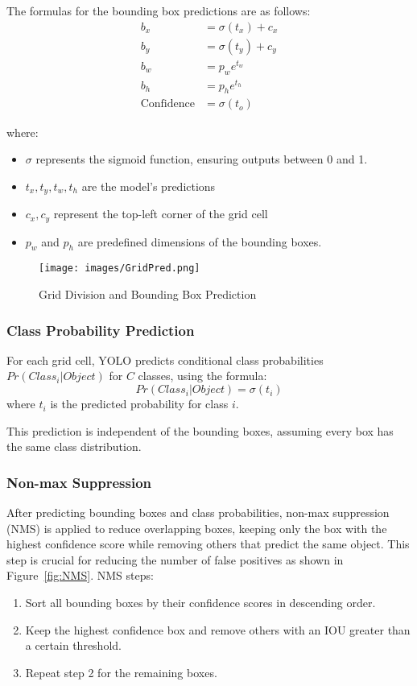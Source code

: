 \documentclass[12pt, letterpaper]{article}
\begin{document}
{\begin{spacing}{1.2}
The formulas for the bounding box predictions are as follows:
\begin{align*}
    b_x &= \sigma(t_x) + c_x \\
    b_y &= \sigma(t_y) + c_y \\
    b_w &= p_w e^{t_w} \\
    b_h &= p_h e^{t_h} \\
    \text{Confidence} &= \sigma(t_o)
\end{align*}

where:
\begin{itemize}
    \item $\sigma$ represents the sigmoid function, ensuring outputs between 0 and 1.
    \item $t_x, t_y, t_w, t_h$ are the model's predictions
    \item $c_x, c_y$ represent the top-left corner of the grid cell
    \item $p_w$ and $p_h$ are predefined dimensions of the bounding boxes.
\end{itemize}

\begin{figure}[htbp]
\centering
\texttt{[image: images/GridPred.png]}
\captionsetup{font=large}
\caption{Grid Division and Bounding Box Prediction}
\label{fig:GridPred}
\end{figure}


\subsubsection{Class Probability Prediction}

For each grid cell, YOLO predicts conditional class probabilities $Pr(Class_i | Object)$ for $C$ classes, using the formula:
\begin{equation*}
    Pr(Class_i | Object) = \sigma(t_{i})
\end{equation*}
where $t_{i}$ is the predicted probability for class $i$.

This prediction is independent of the bounding boxes, assuming every box has the same class distribution.


\subsubsection{Non-max Suppression}
After predicting bounding boxes and class probabilities, non-max suppression (NMS) is applied to reduce overlapping boxes, keeping only the box with the highest confidence score while removing others that predict the same object. This step is crucial for reducing the number of false positives as shown in Figure~\ref{fig:NMS}. NMS steps:
\begin{enumerate}
    \item Sort all bounding boxes by their confidence scores in descending order.
    \item Keep the highest confidence box and remove others with an IOU greater than a certain threshold.
    \item Repeat step 2 for the remaining boxes.
\end{enumerate}


\end{spacing}}
\end{document}
